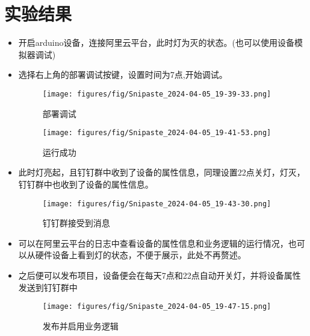 \documentclass[12pt,hyperref,a4paper,UTF8]{ctexart}
\begin{document}
\section{实验结果}
\begin{itemize}
    \item 开启arduino设备，连接阿里云平台，此时灯为灭的状态。(也可以使用设备模拟器调试)
    \item 选择右上角的部署调试按键，设置时间为7点,开始调试。
    \begin{figure}[H]
        \centering
        \texttt{[image: figures/fig/Snipaste\_2024-04-05\_19-39-33.png]}
        \caption{部署调试}
        \label{fig:enter-label}
    \end{figure}
    \begin{figure}[H]
        \centering
        \texttt{[image: figures/fig/Snipaste\_2024-04-05\_19-41-53.png]}
        \caption{运行成功}
        \label{fig:enter-label}
    \end{figure}
    
    \item 此时灯亮起，且钉钉群中收到了设备的属性信息，同理设置22点关灯，灯灭，钉钉群中也收到了设备的属性信息。
    \begin{figure}[H]
        \centering
        \texttt{[image: figures/fig/Snipaste\_2024-04-05\_19-43-30.png]}
        \caption{钉钉群接受到消息}
        \label{fig:enter-label}
    \end{figure}
    \item 可以在阿里云平台的日志中查看设备的属性信息和业务逻辑的运行情况，也可以从硬件设备上看到灯的状态，不便于展示，此处不再赘述。
    \item 之后便可以发布项目，设备便会在每天7点和22点自动开关灯，并将设备属性发送到钉钉群中
    \begin{figure}[H]
        \centering
        \texttt{[image: figures/fig/Snipaste\_2024-04-05\_19-47-15.png]}
        \caption{发布并启用业务逻辑}
        \label{fig:enter-label}
    \end{figure}
\end{itemize}




\end{document}
